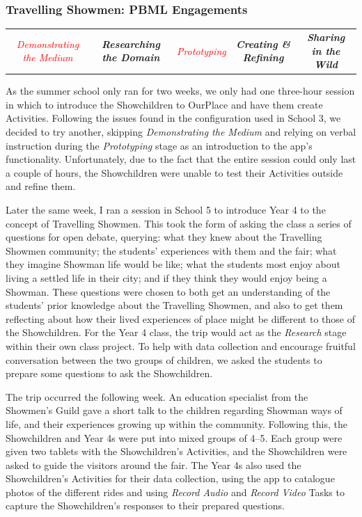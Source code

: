\subsubsection{Travelling Showmen: PBML Engagements}

\begin{table}[h]
    \centering
    \begin{tabulary}{\textwidth}{C|C|p{19mm}|C|C}
    \small\textit{\textcolor{red}{Demonstrating the Medium}} 
    & \small\textit{\textbf{Researching the Domain}}
    & \small\textit{\textcolor{red}{Prototyping}}
    & \small\textit{\textbf{Creating \& Refining}}
    & \small\textit{\textbf{Sharing in the Wild}}\\
\end{tabulary}
\end{table}

As the summer school only ran for two weeks, we only had one three-hour session in which to introduce the Showchildren to OurPlace and have them create Activities. Following the issues found in the configuration used in School 3, we decided to try another, skipping \textit{Demonstrating the Medium} and relying on verbal instruction during the \textit{Prototyping} stage as an introduction to the app's functionality. Unfortunately, due to the fact that the entire session could only last a couple of hours, the Showchildren were unable to test their Activities outside and refine them.

Later the same week, I ran a session in School 5 to introduce Year 4 to the concept of Travelling Showmen. This took the form of asking the class a series of questions for open debate, querying: what they knew about the Travelling Showmen community; the students' experiences with them and the fair; what they imagine Showman life would be like; what the students most enjoy about living a settled life in their city; and if they think they would enjoy being a Showman. These questions were chosen to both get an understanding of the students' prior knowledge about the Travelling Showmen, and also to get them reflecting about how their lived experiences of place might be different to those of the Showchildren. For the Year 4 class, the trip would act as the \textit{Research} stage within their own class project. To help with data collection and encourage fruitful conversation between the two groups of children, we asked the students to prepare some questions to ask the Showchildren.

The trip occurred the following week. An education specialist from the Showmen's Guild gave a short talk to the children regarding Showman ways of life, and their experiences growing up within the community. Following this, the Showchildren and Year 4s were put into mixed groups of 4--5. Each group were given two tablets with the Showchildren's Activities, and the Showchildren were asked to guide the visitors around the fair. The Year 4s also used the Showchildren's Activities for their data collection, using the app to catalogue photos of the different rides and using \textit{Record Audio} and \textit{Record Video} Tasks to capture the Showchildren's responses to their prepared questions.

